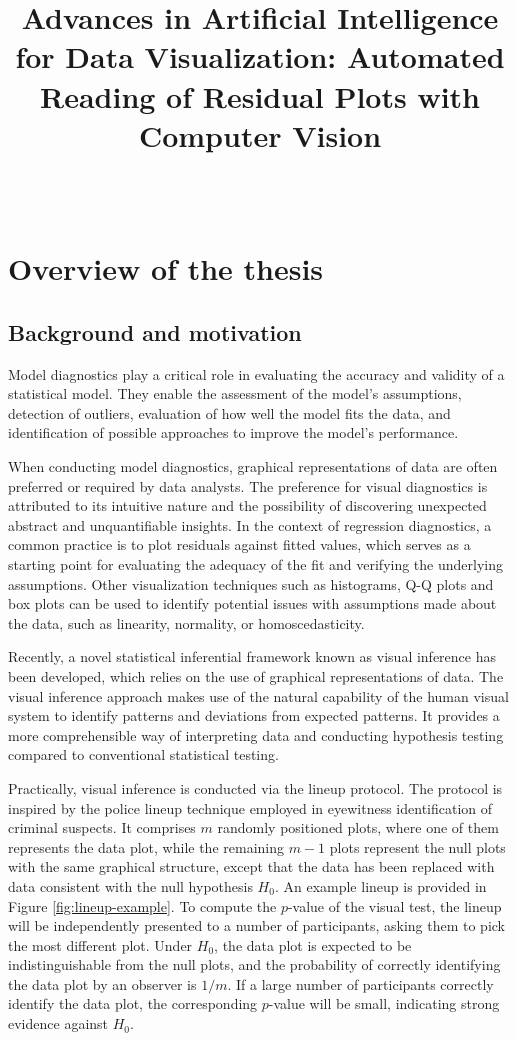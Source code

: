 \documentclass[11pt,a4paper,]{article}
\title{Advances in Artificial Intelligence for Data Visualization: Automated Reading of Residual Plots with Computer Vision}
\author{\sf{\Large\textbf{Weihao (Patrick) Li}\\\large PhD student\\[0.5cm]}}
\date{\sf\Date~\Month~\Year}
\makeatletter
\def\titlepage{\front{\expandafter{\@title}}{\@author}{\@organization}}
\makeatother
\begin{document}
\titlepage

\hypertarget{overview-of-the-thesis}{%
\section{Overview of the thesis}\label{overview-of-the-thesis}}

\hypertarget{background-and-motivation}{%
\subsection{Background and motivation}\label{background-and-motivation}}

Model diagnostics play a critical role in evaluating the accuracy and validity of a statistical model. They enable the assessment of the model's assumptions, detection of outliers, evaluation of how well the model fits the data, and identification of possible approaches to improve the model's performance.

When conducting model diagnostics, graphical representations of data are often preferred or required by data analysts. The preference for visual diagnostics is attributed to its intuitive nature and the possibility of discovering unexpected abstract and unquantifiable insights. In the context of regression diagnostics, a common practice is to plot residuals against fitted values, which serves as a starting point for evaluating the adequacy of the fit and verifying the underlying assumptions. Other visualization techniques such as histograms, Q-Q plots and box plots can be used to identify potential issues with assumptions made about the data, such as linearity, normality, or homoscedasticity.

Recently, a novel statistical inferential framework known as visual inference \autocite{buja_statistical_2009} has been developed, which relies on the use of graphical representations of data. The visual inference approach makes use of the natural capability of the human visual system to identify patterns and deviations from expected patterns. It provides a more comprehensible way of interpreting data and conducting hypothesis testing compared to conventional statistical testing.

Practically, visual inference is conducted via the lineup protocol. The protocol is inspired by the police lineup technique employed in eyewitness identification of criminal suspects. It comprises \(m\) randomly positioned plots, where one of them represents the data plot, while the remaining \(m - 1\) plots represent the null plots with the same graphical structure, except that the data has been replaced with data consistent with the null hypothesis \(H_0\). An example lineup is provided in Figure \ref{fig:lineup-example}. To compute the \(p\)-value of the visual test, the lineup will be independently presented to a number of participants, asking them to pick the most different plot. Under \(H_0\), the data plot is expected to be indistinguishable from the null plots, and the probability of correctly identifying the data plot by an observer is \(1/m\). If a large number of participants correctly identify the data plot, the corresponding \(p\)-value will be small, indicating strong evidence against \(H_0\).
\end{document}
